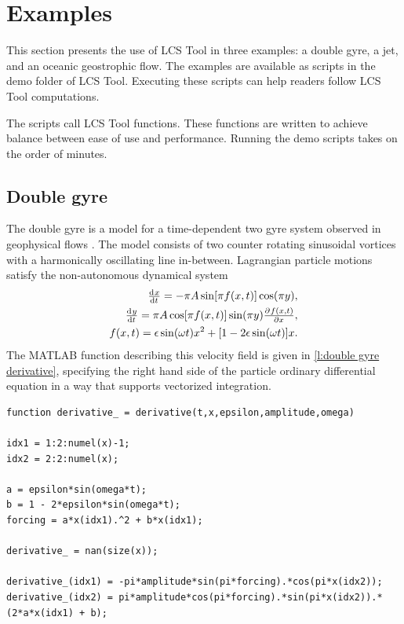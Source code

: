 \documentclass[5p]{elsarticle}
\begin{document}
\section{Examples}

This section presents the use of LCS Tool in three examples: a double gyre, a jet, and an oceanic geostrophic flow. The examples are available as scripts in the demo folder of LCS Tool. Executing these scripts can help readers follow LCS Tool computations.

The scripts call LCS Tool functions.
These functions are written to achieve balance between ease of use and performance.
Running the demo scripts takes on the order of minutes.

\subsection{Double gyre}
The double gyre is a model for a time-dependent two gyre system observed in geophysical flows \citep{shadden05:_defin_lagran_lyapun}. The model consists of two counter rotating sinusoidal vortices with a harmonically oscillating line in-between. Lagrangian particle motions satisfy the non-autonomous dynamical system
\begin{equation}
\begin{split}
\od{x}{t} = -\pi A \sin[\pi f(x,t)] \cos(\pi y),\\
\od{y}{t} = \pi A \cos[\pi f(x,t)] \sin(\pi y) \pd{f(x,t)}{x},\\
f(x,t) = \epsilon \sin(\omega t) x^2 + [1 - 2 \epsilon \sin(\omega t)] x.
\end{split}
\label{eq:double gyre derivative equations}
\end{equation}
The MATLAB function describing this velocity field is given in \cref{l:double gyre derivative}, specifying the right hand side of the particle ordinary differential equation in a way that supports vectorized integration.

\begin{lstlisting}[caption={Double gyre derivative function corresponding to \cref{eq:double gyre derivative equations}.},label=l:double gyre derivative]
function derivative_ = derivative(t,x,epsilon,amplitude,omega)

idx1 = 1:2:numel(x)-1;
idx2 = 2:2:numel(x);

a = epsilon*sin(omega*t);
b = 1 - 2*epsilon*sin(omega*t);
forcing = a*x(idx1).^2 + b*x(idx1);

derivative_ = nan(size(x));

derivative_(idx1) = -pi*amplitude*sin(pi*forcing).*cos(pi*x(idx2));
derivative_(idx2) = pi*amplitude*cos(pi*forcing).*sin(pi*x(idx2)).*(2*a*x(idx1) + b);
\end{lstlisting}
\end{document}
